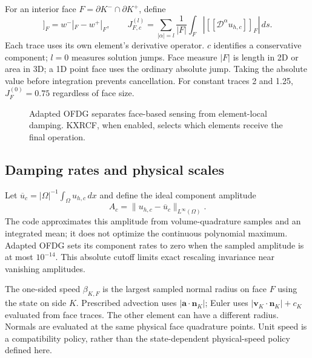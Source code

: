 For an interior face $F=\partial K^-\cap\partial K^+$, define
\begin{equation}
 [\![w]\!]_F=w^-|_F-w^+|_F,
 \qquad
 J_{F,c}^{(l)}=\sum_{|\alpha|=l}\frac1{|F|}\int_F
 \left|[\![\mathscr D^\alpha u_{h,c}]\!]_F\right|\,ds.
 \label{eq:ofdg-face-jump}
\end{equation}
Each trace uses its own element's derivative operator. $c$ identifies a
conservative component; $l=0$ measures solution jumps. Face measure $|F|$ is
length in 2D or area in 3D; a 1D point face uses the ordinary absolute jump.
Taking the absolute value before integration prevents cancellation. For
constant traces 2 and 1.25, $J_F^{(0)}=0.75$ regardless of face size.

\begin{figure}[htbp]
\centering
{}
\caption{Adapted OFDG separates face-based sensing from element-local damping.
KXRCF, when enabled, selects which elements receive the final operation.}
\label{fig:ofdg-pipeline}
\end{figure}

\subsection{Damping rates and physical scales}
Let $\overline u_c=|\Omega|^{-1}\int_\Omega u_{h,c}\,dx$ and define the ideal
component amplitude
\begin{equation}
 A_c=\|u_{h,c}-\overline u_c\|_{L^\infty(\Omega)}.
 \label{eq:ofdg-global-scale}
\end{equation}
The code approximates this amplitude from volume-quadrature samples and an
integrated mean; it does not optimize the continuous polynomial maximum.
Adapted OFDG sets its component rates to zero when the sampled amplitude is
at most $10^{-14}$. This absolute cutoff limits exact rescaling invariance
near vanishing amplitudes.

The one-sided speed $\beta_{K,F}$ is the largest sampled normal radius on
face $F$ using the state on side $K$. Prescribed advection uses
$|\boldsymbol a\cdot\boldsymbol n_K|$; Euler uses
$|\boldsymbol v_K\cdot\boldsymbol n_K|+c_K$ evaluated from face traces.
The other element can have a different radius. Normals are evaluated at the
same physical face quadrature points. Unit speed is a compatibility policy,
rather than the state-dependent physical-speed policy defined here.

